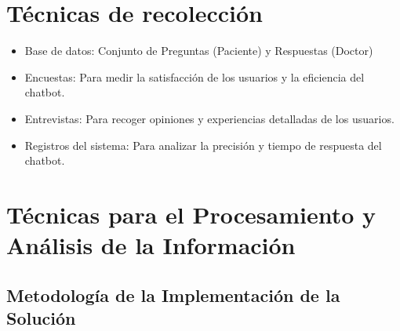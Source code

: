 \section{Técnicas de recolección}
\begin{itemize}
	\item Base de datos: Conjunto de Preguntas (Paciente) y Respuestas (Doctor)
	\item Encuestas: Para medir la satisfacción de los usuarios y la eficiencia del chatbot.
	\item Entrevistas: Para recoger opiniones y experiencias detalladas de los usuarios.
	\item Registros del sistema: Para analizar la precisión y tiempo de respuesta del chatbot.
	
\end{itemize}


\section{Técnicas para el Procesamiento y Análisis de la Información}

\subsection{Metodología de la Implementación de la Solución}

